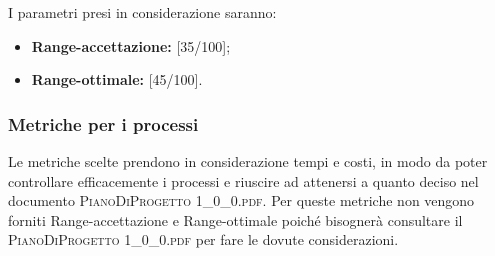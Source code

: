 		I parametri presi in considerazione saranno:
		\begin{itemize}
			\item \textbf{Range-accettazione: }[35/100];
			\item \textbf{Range-ottimale: }[45/100].
		\end{itemize}
		
		\subsubsection{Metriche per i processi}
		Le metriche scelte prendono in considerazione tempi e costi, in modo da poter controllare efficacemente i processi e riuscire ad attenersi a quanto deciso nel documento \textsc{PianoDiProgetto 1\_0\_0.pdf}. 
		Per queste metriche non vengono forniti Range-accettazione e Range-ottimale poiché bisognerà consultare il \textsc{PianoDiProgetto 1\_0\_0.pdf} per fare le dovute considerazioni.
		
